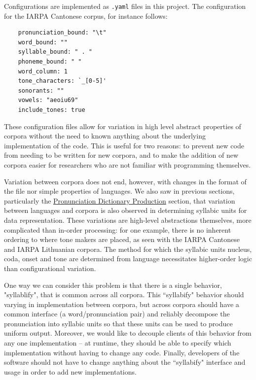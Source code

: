 \documentclass[11pt]{article}
\begin{document}
Configurations are implemented as \verb|.yaml| files in this project. The configuration for the IARPA Cantonese corpus, for instance follows:

\begin{singlespace}
  \begin{verbatim}
    pronunciation_bound: "\t"
    word_bound: ""
    syllable_bound: " . "
    phoneme_bound: " "
    word_column: 1
    tone_characters: `_[0-5]'
    sonorants: ""
    vowels: "aeoiu69"
    include_tones: true
  \end{verbatim}
\end{singlespace}

These configuration files allow for variation in high level abstract properties of corpora without the need to known anything about the underlying implementation of the code. This is useful for two reasons: to prevent new code from needing to be written for new corpora, and to make the addition of new corpora easier for researchers who are not familiar with programming themselves.

Variation between corpora does not end, however, with changes in the format of the file nor simple properties of languages. We also saw in previous sections, particularly the \hyperlink{section.24}{Pronunciation Dictionary Production} section, that variation between languages and corpora is also observed in determining syllabic units for data representation. These variations are high-level abstractions themselves, more complicated than in-order processing: for one example, there is no inherent ordering to where tone makers are placed, as seen with the IARPA Cantonese and IARPA Lithuanian corpora. The method for which the syllabic units nucleus, coda, onset and tone are determined from language necessitates higher-order logic than configurational variation.

One way we can consider this problem is that there is a single behavior, "syllablify", that is common across all corpora. This ``syllabify" behavior should varying in implementation between corpora, but across corpora should have a common interface (a word/pronunciation pair) and reliably decompose the pronunciation into syllabic units so that these units can be used to produce uniform output. Moreover, we would like to decouple clients of this behavior from any one implementation -- at runtime, they should be able to specify which implementation without having to change any code. Finally, developers of the software should not have to change anything about the ``syllabify" interface and usage in order to add new implementations. 
\end{document}
